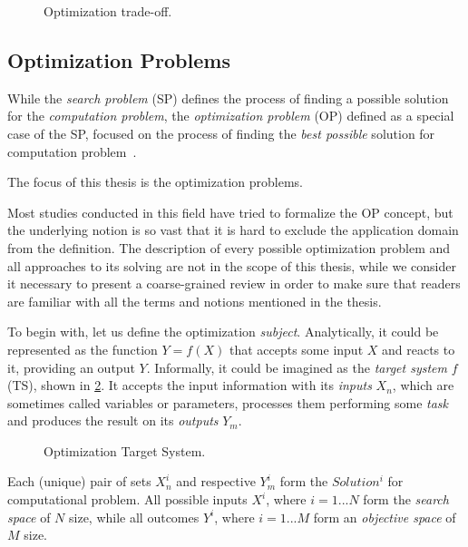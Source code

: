 \begin{figure}
	\centering
	
	\caption{Optimization trade-off.}
	\label{bg:pic:Optimization tradeoff}
\end{figure}

\subsection{Optimization Problems}\label{BG: subsection OPs}
While the \emph{search problem} (SP) defines the process of finding a possible solution for the \emph{computation problem}, the \emph{optimization problem} (OP) defined as a special case of the SP, focused on the process of finding the \emph{best possible} solution for computation problem~\cite{goldreich2010p}.

The focus of this thesis is the optimization problems.

Most studies conducted in this field have tried to formalize the OP concept, but the underlying notion is so vast that it is hard to exclude the application domain from the definition. The description of every possible optimization problem and all approaches to its solving are not in the scope of this thesis, while we consider it necessary to present a coarse-grained review in order to make sure that readers are familiar with all the terms and notions mentioned in the thesis. 

To begin with, let us define the optimization \emph{subject}. Analytically, it could be represented as the function $Y = f(X)$ that accepts some input $X$ and reacts to it, providing an output $Y$. Informally, it could be imagined as the \emph{target system} $f$ (TS), shown in \cref{bg:pic:Target System}. It accepts the input information with its \emph{inputs} $X_n$, which are sometimes called variables or parameters, processes them performing some \emph{task} and produces the result on its \emph{outputs} $Y_m$.

\begin{figure}[!h]
	\centering
	
	\caption{Optimization Target System.}
	\label{bg:pic:Target System}
\end{figure}

Each (unique) pair of sets $X_n^i$ and respective $Y_m^i$ form the $Solution^i$ for computational problem.
All possible inputs $X^i$, where $i=1...N$ form the \emph{search space} of $N$ size, while all outcomes $Y^i$, where $i=1...M$ form an \emph{objective space} of $M$ size.


